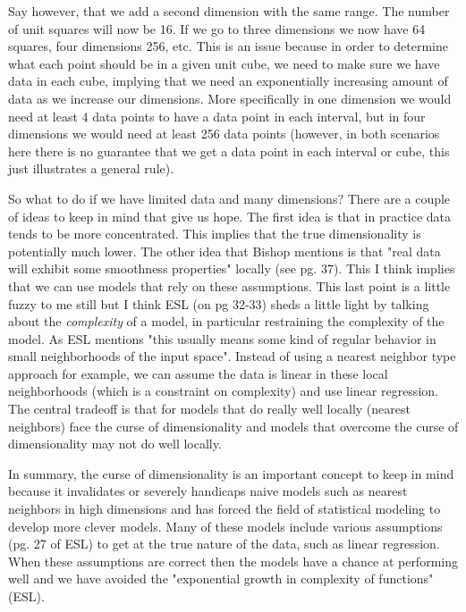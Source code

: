 Say however, that we add a second dimension with the same range. The number of unit squares will now be 16. If we go to three dimensions we now have 64 squares, four dimensions 256, etc. This is an issue because in order to determine what each point should be in a given unit cube, we need to make sure we have data in each cube, implying that we need an exponentially increasing amount of data as we increase our dimensions. More specifically in one dimension we would need at least 4 data points to have a data point in each interval, but in four dimensions we would need at least 256 data points (however, in both scenarios here there is no guarantee that we get a data point in each interval or cube, this just illustrates a general rule).

So what to do if we have limited data and many dimensions? There are a couple of ideas to keep in mind that give us hope. The first idea is that in practice data tends to be more concentrated. This implies that the true dimensionality is potentially much lower. The other idea that Bishop mentions is that "real data will exhibit some smoothness properties" locally (see pg. 37). This I think implies that we can use models that rely on these assumptions. This last point is a little fuzzy to me still but I think ESL (on pg 32-33) sheds a little light by talking about the \emph{complexity} of a model, in particular restraining the complexity of the model. As ESL mentions "this usually means some kind of regular behavior in small neighborhoods of the input space". Instead of using a nearest neighbor type approach for example, we can assume the data is linear in these local neighborhoods (which is a constraint on complexity) and use linear regression. The central tradeoff is that for models that do really well locally (nearest neighbors) face the curse of dimensionality and models that overcome the curse of dimensionality may not do well locally.

In summary, the curse of dimensionality is an important concept to keep in mind because it invalidates or severely handicaps naive models such as nearest neighbors in high dimensions and has forced the field of statistical modeling to develop more clever models. Many of these models include various assumptions (pg. 27 of ESL) to get at the true nature of the data, such as linear regression. When these assumptions are correct then the models have a chance at performing well and we have avoided the "exponential growth in complexity of functions" (ESL).


